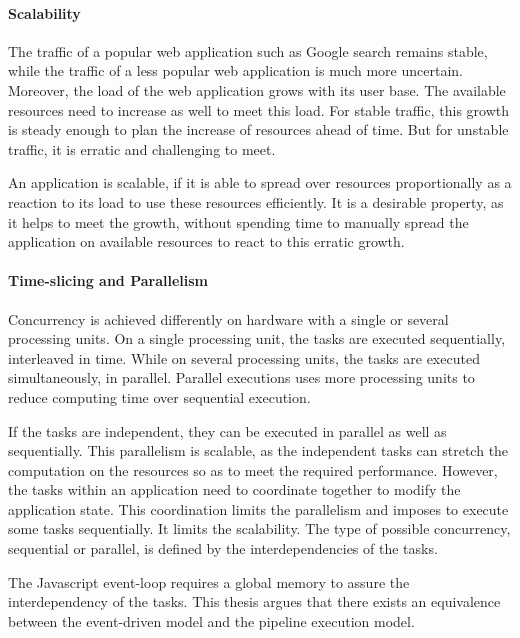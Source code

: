 \paragraph{Scalability}

The traffic of a popular web application such as Google search remains stable, while the traffic of a less popular web application is much more uncertain.
Moreover, the load of the web application grows with its user base.
The available resources need to increase as well to meet this load.
For stable traffic, this growth is steady enough to plan the increase of resources ahead of time.
But for unstable traffic, it is erratic and challenging to meet.

An application is scalable, if it is able to spread over resources proportionally as a reaction to its load to use these resources efficiently.
It is a desirable property, as it helps to meet the growth, without spending time to manually spread the application on available resources to react to this erratic growth.

\paragraph{Time-slicing and Parallelism}

Concurrency is achieved differently on hardware with a single or several processing units.
On a single processing unit, the tasks are executed sequentially, interleaved in time.
While on several processing units, the tasks are executed simultaneously, in parallel.
Parallel executions uses more processing units to reduce computing time over sequential execution.

If the tasks are independent, they can be executed in parallel as well as sequentially.
This parallelism is scalable, as the independent tasks can stretch the computation on the resources so as to meet the required performance.
However, the tasks within an application need to coordinate together to modify the application state.
This coordination limits the parallelism and imposes to execute some tasks sequentially.
It limits the scalability.
The type of possible concurrency, sequential or parallel, is defined by the interdependencies of the tasks.

The Javascript event-loop requires a global memory to assure the interdependency of the tasks.
This thesis argues that there exists an equivalence between the event-driven model and the pipeline execution model.

